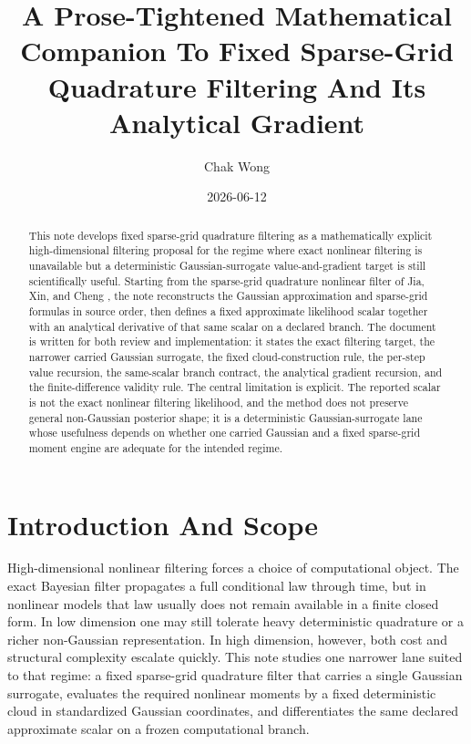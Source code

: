 \documentclass[11pt]{article}
\title{A Prose-Tightened Mathematical Companion To Fixed Sparse-Grid Quadrature Filtering And Its Analytical Gradient}
\author{Chak Wong}
\date{2026-06-12}
\numberwithin{equation}{section}
\begin{document}
\maketitle

\begin{abstract}
This note develops fixed sparse-grid quadrature filtering as a
mathematically explicit high-dimensional filtering proposal for the regime where
exact nonlinear filtering is unavailable but a deterministic Gaussian-surrogate
value-and-gradient target is still scientifically useful.  Starting from the
sparse-grid quadrature nonlinear filter of Jia, Xin, and Cheng
\cite{jia2012sparsegrid}, the note reconstructs the Gaussian approximation and
sparse-grid formulas in source order, then defines a fixed approximate
likelihood scalar together with an analytical derivative of that same scalar on
a declared branch.  The document is written for both review and implementation:
it states the exact filtering target, the narrower carried Gaussian surrogate,
the fixed cloud-construction rule, the per-step value recursion, the
same-scalar branch contract, the analytical gradient recursion, and the
finite-difference validity rule.  The central limitation is explicit.  The
reported scalar is not the exact nonlinear filtering likelihood, and the method
does not preserve general non-Gaussian posterior shape; it is a deterministic
Gaussian-surrogate lane whose usefulness depends on whether one carried Gaussian
and a fixed sparse-grid moment engine are adequate for the intended regime.
\end{abstract}

\section{Introduction And Scope}
\label{sec:p33-reader-orientation}

High-dimensional nonlinear filtering forces a choice of computational object.
The exact Bayesian filter propagates a full conditional law through time, but in
nonlinear models that law usually does not remain available in a finite closed
form.  In low dimension one may still tolerate heavy deterministic quadrature or
a richer non-Gaussian representation.  In high dimension, however, both cost and
structural complexity escalate quickly.  This note studies one narrower lane
suited to that regime: a fixed sparse-grid quadrature filter that carries a
single Gaussian surrogate, evaluates the required nonlinear moments by a fixed
deterministic cloud in standardized Gaussian coordinates, and differentiates the
same declared approximate scalar on a frozen computational branch.
\end{document}
